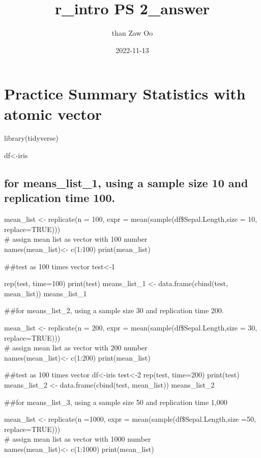 \documentclass[
]{article}
\title{r\_intro PS 2\_answer}
\author{than Zaw Oo}
\date{2022-11-13}
\begin{document}
\maketitle

\hypertarget{practice-summary-statistics-with-atomic-vector}{%
\section{Practice Summary Statistics with atomic
vector}\label{practice-summary-statistics-with-atomic-vector}}

library(tidyverse)

df\textless-iris

\hypertarget{for-means_list_1-using-a-sample-size-10-and-replication-time-100.}{%
\subsection{for means\_list\_1, using a sample size 10 and replication
time
100.}\label{for-means_list_1-using-a-sample-size-10-and-replication-time-100.}}

mean\_list \textless- replicate(n = 100, expr =
mean(sample(df\$Sepal.Length,size = 10, replace=TRUE)))\\
\# assign mean list as vector with 100 number\\
names(mean\_list)\textless- c(1:100) print(mean\_list)

\#\#test as 100 times vector test\textless-1

rep(test, time=100) print(test) means\_list\_1 \textless-
data.frame(cbind(test, mean\_list)) means\_list\_1

\#\#for means\_list\_2, using a sample size 30 and replication time 200.

mean\_list \textless- replicate(n = 200, expr =
mean(sample(df\$Sepal.Length,size = 30, replace=TRUE)))\\
\# assign mean list as vector with 200 number\\
names(mean\_list)\textless- c(1:200) print(mean\_list)

\#\#test as 100 times vector df\textless-iris test\textless-2 rep(test,
time=200) print(test) means\_list\_2 \textless- data.frame(cbind(test,
mean\_list)) means\_list\_2

\#\#for means\_list\_3, using a sample size 50 and replication time
1,000

mean\_list \textless- replicate(n =1000, expr =
mean(sample(df\$Sepal.Length,size =50, replace=TRUE)))\\
\# assign mean list as vector with 1000 number\\
names(mean\_list)\textless- c(1:1000) print(mean\_list)
\end{document}
